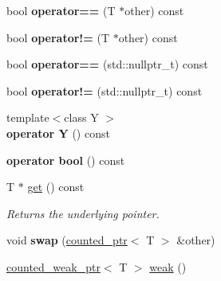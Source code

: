 \begin{DoxyCompactItemize}
\item 
\hypertarget{classcounted__ptr_a7856a4c20c73443d5e1fc4cd7ad79ad8}{}bool {\bfseries operator==} (T $\ast$other) const \label{classcounted__ptr_a7856a4c20c73443d5e1fc4cd7ad79ad8}

\item 
\hypertarget{classcounted__ptr_ae82469dbfbf5563eaaa0822cee2d38d1}{}bool {\bfseries operator!=} (T $\ast$other) const \label{classcounted__ptr_ae82469dbfbf5563eaaa0822cee2d38d1}

\item 
\hypertarget{classcounted__ptr_a29dcb00457a0cac907bd12b7dfd206e3}{}bool {\bfseries operator==} (std\+::nullptr\+\_\+t) const \label{classcounted__ptr_a29dcb00457a0cac907bd12b7dfd206e3}

\item 
\hypertarget{classcounted__ptr_a5e370712d723f94cd71404b87342a7fd}{}bool {\bfseries operator!=} (std\+::nullptr\+\_\+t) const \label{classcounted__ptr_a5e370712d723f94cd71404b87342a7fd}

\item 
\hypertarget{classcounted__ptr_af78f6ab8e8fbb783e2d247a3114f6f46}{}{\footnotesize template$<$class Y $>$ }\\{\bfseries operator Y} () const \label{classcounted__ptr_af78f6ab8e8fbb783e2d247a3114f6f46}

\item 
\hypertarget{classcounted__ptr_ae3a2ff3bd87764f41dd7a617a4379272}{}{\bfseries operator bool} () const \label{classcounted__ptr_ae3a2ff3bd87764f41dd7a617a4379272}

\item 
\hypertarget{classcounted__ptr_a5a33e60661ce46ce72cdbd76a2905260}{}T $\ast$ \hyperlink{classcounted__ptr_a5a33e60661ce46ce72cdbd76a2905260}{get} () const \label{classcounted__ptr_a5a33e60661ce46ce72cdbd76a2905260}

\begin{DoxyCompactList}\small\item\em Returns the underlying pointer. \end{DoxyCompactList}\item 
\hypertarget{classcounted__ptr_aa5ea349f9d867155d7b913c02cbea3c2}{}void {\bfseries swap} (\hyperlink{classcounted__ptr}{counted\+\_\+ptr}$<$ T $>$ \&other)\label{classcounted__ptr_aa5ea349f9d867155d7b913c02cbea3c2}

\item 
\hypertarget{classcounted__ptr_a0c38418e48610ae1573fbb1925147cae}{}\hyperlink{classcounted__weak__ptr}{counted\+\_\+weak\+\_\+ptr}$<$ T $>$ \hyperlink{classcounted__ptr_a0c38418e48610ae1573fbb1925147cae}{weak} ()\label{classcounted__ptr_a0c38418e48610ae1573fbb1925147cae}


\end{DoxyCompactItemize}
